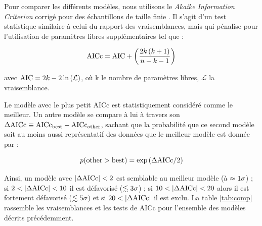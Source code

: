 \documentclass[a4paper, 12pt, svgnames]{article}
\begin{document}
Pour comparer les différents modèles, nous utilisons le \textit{Akaike
Information Criterion} corrigé pour des échantillons de taille finie
\cite{burnham_model_2002}. Il s'agit d'un test statistique similaire à celui du
rapport des vraisemblances, mais qui pénalise pour l'utilisation de paramètres
libres supplémentaires tel que :

\begin{equation}
    \mathrm{AICc} = \mathrm{AIC} + \left(\frac{2k\left(k+1\right)}{n - k - 1}\right)
\end{equation}

\noindent avec $\mathrm{AIC} = 2k - 2\ln\left(\mathcal{L}\right)$, où k le nombre de
paramètres libres, $\mathcal{L}$ la vraisemblance. \bigbreak

Le modèle avec le plus petit $\mathrm{AICc}$ est statistiquement considéré comme
le meilleur. Un autre modèle se compare à lui à travers son $\Delta \mathrm{AICc}
\equiv \mathrm{AICc_{best}}-\mathrm{AICc_{other}}$, sachant que la probabilité
que ce second modèle soit au moins aussi représentatif des données que le
meilleur modèle est donnée par :

\begin{equation}
    p(\mathrm{other} > \mathrm{best}) = \exp\left(\Delta\mathrm{AICc}/2\right)
\end{equation}

Ainsi, un modèle avec $\abs{\Delta\mathrm{AICc}} < 2$ est semblable au meilleur
modèle (à $\approx1\sigma$) ; si $2<\abs{\Delta\mathrm{AICc}}<10$ il est défavorisé
($\lesssim3\sigma$) ; si $10<\abs{\Delta\mathrm{AICc}}<20$ alors il est fortement
défavorisé ($\lesssim5\sigma$) et si $20<\abs{\Delta \mathrm{AICc}}$ il est exclu. La
table \ref{tab:comp} rassemble les vraisemblances et les tests de AICc pour
l'ensemble des modèles décrits précédemment. \bigbreak
\end{document}
